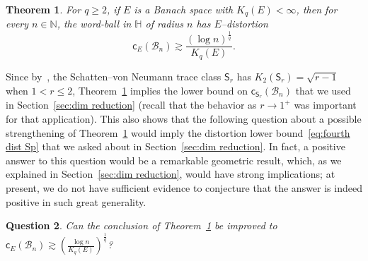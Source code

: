 \documentclass[11pt,reqno]{amsart}
\renewcommand{\H}{\mathbb{H}}
\newcommand{\N}{\mathbb{N}}
\newcommand{\cc}{{\mathsf{c}}}
\newcommand{\0}{\mathbf{0}}
\renewcommand{\1}{\mathbf 1}
\renewcommand{\ge}{\geqslant}
\renewcommand{\le}{\leqslant}
\newtheorem{thm}{Theorem}[section]
\newtheorem{question}[thm]{Question}
\theoremstyle{remark}
\begin{document}
\begin{thm}\label{thm:nonembedding KE} For $q\ge 2$, if $E$ is a Banach space with $K_q(E)<\infty$, then for every $n\in \N$, the word-ball in $\H$ of radius $n$ has $E$--distortion
$$
\cc_E(\mathcal{B}_n)\gtrsim \frac{(\log n)^{\frac{1}{q}}}{K_q(E)}.
$$
\end{thm}
Since by~\cite{BCL94}, the Schatten--von Neumann trace class $\mathsf{S}_r$ has $K_2(\mathsf{S}_r)=\sqrt{r-1}$ when $1<r\le 2$, Theorem~\ref{thm:nonembedding KE} implies the lower bound on $\cc_{\mathsf{S}_r}(\mathcal{B}_n)$ that we used in Section~\ref{sec:dim reduction} (recall that the behavior as $r\to 1^+$ was important for that application). This also shows that the following question about a possible strengthening of Theorem~\ref{thm:nonembedding KE} would imply the distortion lower bound~\eqref{eq:fourth dist Sp} that we asked about in Section~\ref{sec:dim reduction}. In fact, a positive answer to this question would be a remarkable geometric result, which, as we explained in Section~\ref{sec:dim reduction}, would have strong implications; at present, we do not have sufficient evidence to conjecture that the answer is indeed positive in such great generality.



\begin{question} Can the conclusion of Theorem~\ref{thm:nonembedding KE} be improved to
$
\cc_E(\mathcal{B}_n)\gtrsim \left(\frac{\log n}{K_q(E)}\right)^{\frac{1}{q}}
$?
\end{question}
\end{document}
